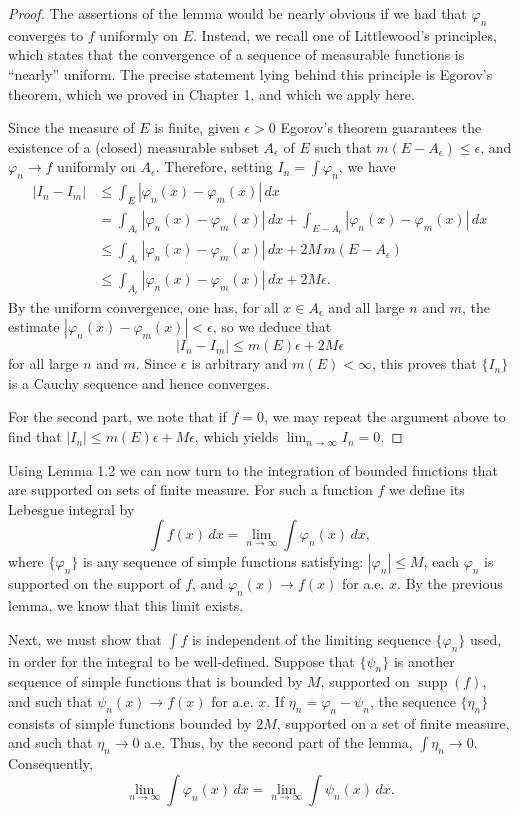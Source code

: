 \documentclass[11pt,openany]{book}
\begin{document}
\begin{proof}
The assertions of the lemma would be nearly obvious if we had that $\varphi_n$ converges to $f$ uniformly on $E$. Instead, we recall one of Littlewood's principles, which states that the convergence of a sequence of measurable functions is ``nearly'' uniform. The precise statement lying behind this principle is Egorov's theorem, which we proved in Chapter 1, and which we apply here.

Since the measure of $E$ is finite, given $\epsilon>0$ Egorov's theorem guarantees the existence of a (closed) measurable subset $A_\epsilon$ of $E$ such that $m(E-A_\epsilon)\leq\epsilon$, and $\varphi_n\to f$ uniformly on $A_\epsilon$. Therefore, setting $I_n=\int\varphi_n$, we have
\begin{align*}
|I_n-I_m|
&\leq\int_E|\varphi_n(x)-\varphi_m(x)|\,dx\\
&=\int_{A_\epsilon}|\varphi_n(x)-\varphi_m(x)|\,dx
 +\int_{E-A_\epsilon}|\varphi_n(x)-\varphi_m(x)|\,dx\\
&\leq\int_{A_\epsilon}|\varphi_n(x)-\varphi_m(x)|\,dx
 +2M\,m(E-A_\epsilon)\\
&\leq\int_{A_\epsilon}|\varphi_n(x)-\varphi_m(x)|\,dx+2M\epsilon.
\end{align*}
By the uniform convergence, one has, for all $x\in A_\epsilon$ and all large $n$ and $m$, the estimate $|\varphi_n(x)-\varphi_m(x)|<\epsilon$, so we deduce that
\[
|I_n-I_m|\leq m(E)\epsilon+2M\epsilon
\]
for all large $n$ and $m$. Since $\epsilon$ is arbitrary and $m(E)<\infty$, this proves that $\{I_n\}$ is a Cauchy sequence and hence converges.

For the second part, we note that if $f=0$, we may repeat the argument above to find that $|I_n|\leq m(E)\epsilon+M\epsilon$, which yields $\lim_{n\to\infty}I_n=0$.
\end{proof}

Using Lemma 1.2 we can now turn to the integration of bounded functions that are supported on sets of finite measure. For such a function $f$ we define its Lebesgue integral by
\[
\int f(x)\,dx
=\lim_{n\to\infty}\int\varphi_n(x)\,dx,
\]
where $\{\varphi_n\}$ is any sequence of simple functions satisfying: $|\varphi_n|\leq M$, each $\varphi_n$ is supported on the support of $f$, and $\varphi_n(x)\to f(x)$ for a.e. $x$. By the previous lemma, we know that this limit exists.

Next, we must show that $\int f$ is independent of the limiting sequence $\{\varphi_n\}$ used, in order for the integral to be well-defined. Suppose that $\{\psi_n\}$ is another sequence of simple functions that is bounded by $M$, supported on $\operatorname{supp}(f)$, and such that $\psi_n(x)\to f(x)$ for a.e. $x$. If $\eta_n=\varphi_n-\psi_n$, the sequence $\{\eta_n\}$ consists of simple functions bounded by $2M$, supported on a set of finite measure, and such that $\eta_n\to0$ a.e. Thus, by the second part of the lemma, $\int\eta_n\to0$. Consequently,
\[
\lim_{n\to\infty}\int\varphi_n(x)\,dx
=\lim_{n\to\infty}\int\psi_n(x)\,dx.
\]
\end{document}
